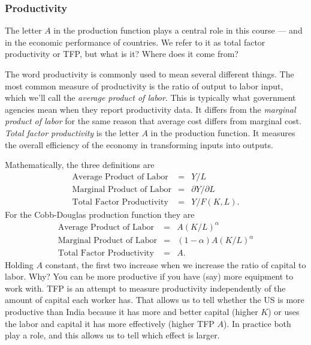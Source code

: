\documentclass[letterpaper,12pt]{article}
\begin{document}
\subsubsection*{Productivity}

The letter $A$ in the production function plays a central role
in this course ---
and in the economic performance of countries.
We refer to it as total factor productivity or TFP,
but what is it?  Where does it come from?


The word productivity is commonly used to mean several different
things. The most common measure of productivity is the ratio of
output to labor input, which we'll call the {\it average product
of labor\/}. This is typically what government agencies mean when
they report productivity data.  It differs from the {\it marginal
product of labor\/} for the same reason that average cost differs
from marginal cost. {\it Total factor productivity\/} is
the letter $A$ in the production function. It measures the overall
efficiency of the economy in transforming inputs into outputs.

Mathematically, the three definitions are
\begin{eqnarray*}
    \mbox{Average Product of Labor} &=& Y / L \\
    \mbox{Marginal Product of Labor} &=& \partial Y / \partial L \\
    \mbox{Total Factor Productivity} &=& Y / F(K,L) .
\end{eqnarray*}
For the Cobb-Douglas production function they are
\begin{eqnarray*}
    \mbox{Average Product of Labor} &=& A (K/L)^\alpha  \\
    \mbox{Marginal Product of Labor} &=& (1-\alpha) A (K/L)^\alpha  \\
    \mbox{Total Factor Productivity} &=& A  .
\end{eqnarray*}
Holding $A$ constant,
the first two increase when we increase the ratio of capital to labor.
Why?
You can be more productive if you have
(say) more equipment to work with.
TFP is an attempt to measure productivity independently
of the amount of capital each worker has.
That allows us to tell whether the US is more productive
than India because it has more and better capital (higher $K$)
or uses the labor and capital it has more effectively (higher TFP $A$).
In practice both play a role,
and this allows us to tell which effect is larger.
\end{document}
